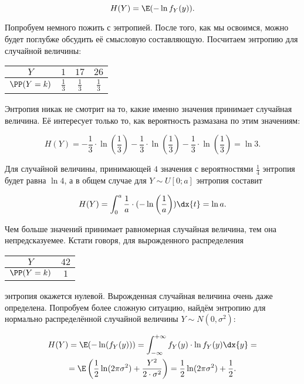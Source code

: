 \[ H(Y) = \E(- \ln f_Y(y)). \]

Попробуем немного пожить с энтропией. После того, как мы освоимся, можно будет поглубже обсудить её смысловую составляющую. Посчитаем энтропию для случайной величины:

\begin{center}
	\begin{tabular}{c|c|c|c}
		$Y$ & $1$ & $17$  &  $26$  \\ \hline
		$\PP(Y = k)$ & $\frac{1}{3}$ & $\frac{1}{3}$  & $\frac{1}{3}$ 
	\end{tabular}
\end{center}

Энтропия никак не смотрит на то, какие именно значения принимает случайная величина. Её интересует только то, как вероятность размазана по этим значениям:

\[ H(Y) = - \frac{1}{3} \cdot \ln \left(\frac{1}{3}\right)- \frac{1}{3} \cdot \ln \left(\frac{1}{3}\right) - \frac{1}{3} \cdot \ln \left(\frac{1}{3}\right) = \ln 3.\] 

Для случайной величины, принимающей $4$ значения с вероятностями $\frac{1}{4}$ энтропия будет равна $\ln 4$, а в общем случае для $Y \sim U[0;a]$ энтропия составит 

\[H(Y) = \int_0^a \frac{1}{a} \cdot (- \ln\left(\frac{1}{a}\right)) \dx{t} = \ln a. \]

Чем больше значений принимает равномерная случайная величина, тем она непредсказуемее.  Кстати говоря, для вырожденного распределения 

\begin{center}
	\begin{tabular}{c|c}
		$Y$ & $42$   \\ \hline
		$\PP(Y = k)$ & $1$
	\end{tabular}
\end{center}

энтропия окажется нулевой. Вырожденная случайная величина очень даже определена. Попробуем более сложную ситуацию, найдём энтропию для нормально распределённой случайной величины $Y \sim N(0, \sigma^2)$:

\begin{multline*}
H(Y) = \E( - \ln(f_Y(y)))  = \int_{-\infty}^{+\infty} f_Y(y) \cdot \ln f_Y(y) \dx{y} = \\ = \E\left(\frac{1}{2} \ln(2 \pi \sigma^2 ) + \frac{Y^2}{2\cdot \sigma^2}\right) = \frac{1}{2} \ln(2 \pi \sigma^2) + \frac{1}{2}.
\end{multline*} 

